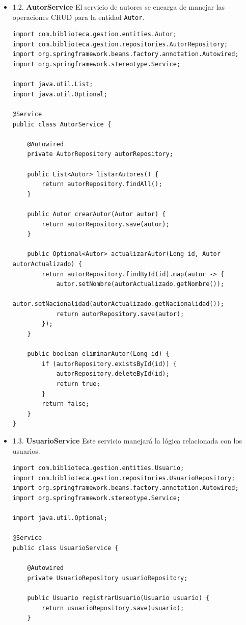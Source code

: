 \documentclass[11pt]{article}
\begin{document}
\begin{itemize}
\item 1.2. \textbf{AutorService}
\label{sec:org2d2f949}
El servicio de autores se encarga de manejar las operaciones CRUD para
la entidad \texttt{Autor}.

\begin{verbatim}
import com.biblioteca.gestion.entities.Autor;
import com.biblioteca.gestion.repositories.AutorRepository;
import org.springframework.beans.factory.annotation.Autowired;
import org.springframework.stereotype.Service;

import java.util.List;
import java.util.Optional;

@Service
public class AutorService {

    @Autowired
    private AutorRepository autorRepository;

    public List<Autor> listarAutores() {
        return autorRepository.findAll();
    }

    public Autor crearAutor(Autor autor) {
        return autorRepository.save(autor);
    }

    public Optional<Autor> actualizarAutor(Long id, Autor autorActualizado) {
        return autorRepository.findById(id).map(autor -> {
            autor.setNombre(autorActualizado.getNombre());
            autor.setNacionalidad(autorActualizado.getNacionalidad());
            return autorRepository.save(autor);
        });
    }

    public boolean eliminarAutor(Long id) {
        if (autorRepository.existsById(id)) {
            autorRepository.deleteById(id);
            return true;
        }
        return false;
    }
}
\end{verbatim}

\item 1.3. \textbf{UsuarioService}
\label{sec:org7acf145}
Este servicio manejará la lógica relacionada con los usuarios.

\begin{verbatim}
import com.biblioteca.gestion.entities.Usuario;
import com.biblioteca.gestion.repositories.UsuarioRepository;
import org.springframework.beans.factory.annotation.Autowired;
import org.springframework.stereotype.Service;

import java.util.Optional;

@Service
public class UsuarioService {

    @Autowired
    private UsuarioRepository usuarioRepository;

    public Usuario registrarUsuario(Usuario usuario) {
        return usuarioRepository.save(usuario);
    }


\end{verbatim}
\end{itemize}
\end{document}
